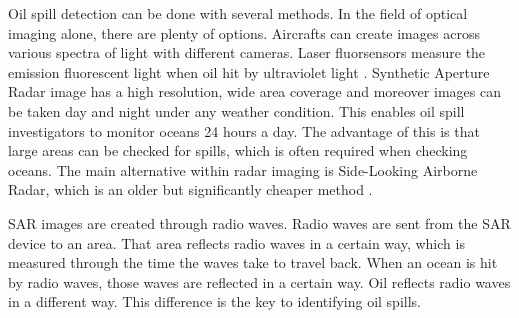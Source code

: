 Oil spill detection can be done with several methods. In the field of optical imaging alone, there are plenty of options. Aircrafts can create images across various spectra of light with different cameras. 
Laser fluorsensors measure the emission fluorescent light when oil hit by ultraviolet light \cite{fingas2014review}.
Synthetic Aperture Radar image has a high resolution, wide area coverage and moreover images can be taken day and night under any weather condition. This enables oil spill investigators to monitor oceans 24 hours a day\cite{Chang20081915}. The advantage of this is that large areas can be checked for spills, which is often required when checking oceans. 
The main alternative within radar imaging is Side-Looking Airborne Radar, which is an older but significantly cheaper method \cite{fingas2014review}. 

SAR images are created through radio waves. Radio waves are sent from the SAR device to an area. That area reflects radio waves in a certain way, which is measured through the time the waves take to travel back. \cite{Doerry:04} When an ocean is hit by radio waves, those waves are reflected in a certain way. Oil reflects radio waves in a different way. This difference is the key to identifying oil spills.







